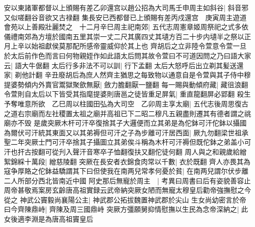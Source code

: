 安以東諸軍都督以上頒賜有差乙卯還宫以趙公招為大司馬壬申周主如斜谷|{
	斜音邪又似嗟翻谷音欲又古禄翻}
集長安已西都督已上頒賜有差丙戍還宫　庚寅周主遊道會苑以上善殿壯麗焚之　十二月辛巳周主祀南郊|{
	五代志周憲章姬周祭祀之式多依儀禮南郊為方壇於國南五里其崇一丈二尺其廣四丈其壝方百二十步内壝半之祭以正月上辛以始祖獻侯莫那配所感帝靈威仰於其上也}
齊胡后之立非陸令萱意令萱一旦於太后前作色而言曰何物親姪作如此語太后問其故令萱曰不可道因問之乃曰語大家云|{
	語大牛倨翻}
太后行多非法不可以訓|{
	行下孟翻}
太后大怒呼后出立剃其髪送還家|{
	剃他計翻}
辛丑廢胡后為庶人然齊主猶思之每致物以通意自是令萱與其子侍中穆提婆勢傾内外賣官鬻獄聚歛無厭|{
	斂力膽翻厭一鹽翻}
每一賜與動傾府藏|{
	藏徂浪翻}
令萱則自太后以下皆受其指麾提婆則唐邕之徒皆重足屏氣|{
	重直龍翻屏必郢翻}
殺生予奪唯意所欲　乙巳周以柱國田弘為大司空　乙卯周主享太廟|{
	五代志後周思復古之道右宗廟而左社稷置太祖之廟并高祖已下二昭二穆凡五親盡則遷其有德者謂之祧廟亦不毁}
是歲突厥木杆可汗卒復捨其子大邏便而立其弟是為佗鉢可汗佗鉢以攝國為爾伏可汗統其東面又以其弟褥但可汗之子為步離可汗居西面|{
	厥九勿翻梁世祖承聖二年突厥士門可汗卒捨其子攝圖立其弟俟斗稱為木杆可汗褥但既佗鉢之弟盖小可汗也扞古按翻可從刋入聲汗音寒卒子恤翻復扶又翻佗徒何翻}
周人與之和親歲給繒絮錦綵十萬段|{
	繒慈陵翻}
突厥在長安者衣錦食肉常以千數|{
	衣於既翻}
齊人亦畏其為寇争厚賂之佗鉢益驕謂其下曰但使我在南两兒常孝何憂於貧|{
	在南两兒謂尔伏步離二人所部分西北皆南近中國}
阿史那后無寵於周主　|{
	考異曰周書曰后有姿貌善容止周帝甚敬焉案房玄齡唐高祖實録云武帝納突厥女陋而無寵太穆皇后勸帝強撫慰之今從之}
神武公竇毅尚襄陽公主|{
	神武郡公拓拔魏置神武郡於尖山}
生女尚幼密言於帝曰今齊陳鼎峙|{
	齊陳及周三國鼎峙}
突厥方彊願舅抑情慰撫以生民為念帝深納之|{
	此女後適李淵是為唐高祖竇皇后}


